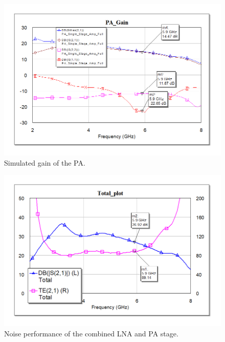 \documentclass[reprint, aps, prl]{revtex4-1}
\begin{document}
\begin{figure}[!htbp]
    \centering
    \includegraphics[scale=0.35]{PA_Gain.png}
    \caption{Simulated gain of the PA.}
    \label{fig:PAGain}
\end{figure}

\begin{figure}[!htbp]
    \centering
    \includegraphics[scale=0.35]{LNA+PA_Gain+Noise.png}
    \caption{Noise performance of the combined LNA and PA stage.}
    \label{fig:LNAGainNoise}
\end{figure}
\end{document}
